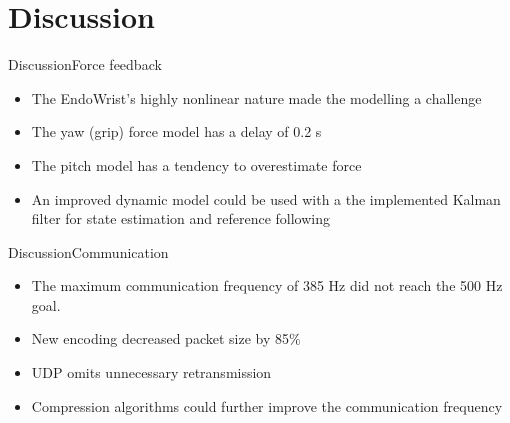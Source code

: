 \section{Discussion}

\begin{frame}{Discussion}{Force feedback}
	
	
	\begin{itemize}
		\item The EndoWrist's highly nonlinear nature made the modelling a challenge
		\item The yaw (grip) force model has a delay of 0.2 s 
		\item The pitch model has a tendency to overestimate force
		\item An improved dynamic model could be used with a the implemented Kalman filter for state estimation and reference following
	\end{itemize}
	
	
\end{frame}

\begin{frame}{Discussion}{Communication}


  \begin{itemize}
  	\item The maximum communication frequency of 385 Hz did not reach the 500 Hz goal.
  	\item New encoding  decreased packet size by 85\%
  	\item UDP omits unnecessary retransmission
  	\item Compression algorithms could further improve the communication frequency

  	
   
  \end{itemize}


\end{frame}






